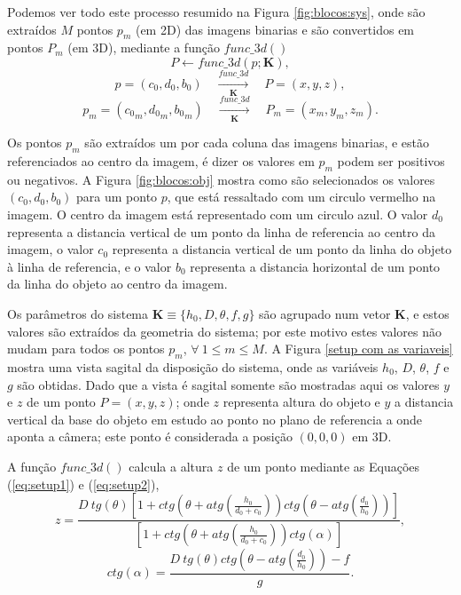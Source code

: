 \documentclass[a4paper, 12pt]{article}
\begin{document}
Podemos ver todo este processo resumido na Figura \ref{fig:blocos:sys},
onde são extraídos $M$ pontos $p_m$ (em 2D) das imagens binarias 
e são convertidos em pontos $P_m$ (em 3D),
mediante a função $func\_3d()$ 
\begin{equation}
P \leftarrow func\_3d(p;\mathbf{K}),
\end{equation}
\begin{equation}
p=(c_0,d_0,b_0)\quad \xrightarrow[\mathbf{K}]{func\_3d} \quad P=(x,y,z),
\end{equation}
\begin{equation}
p_m=({c_0}_m,{d_0}_m,{b_0}_m)\quad \xrightarrow[\mathbf{K}]{func\_3d}\quad P_m=(x_m,y_m,z_m).
\end{equation}

Os pontos $p_m$ são extraídos um por cada coluna das imagens binarias,
e estão referenciados ao centro da imagem, é dizer os valores em $p_m$ podem ser positivos ou negativos.
A Figura \ref{fig:blocos:obj} mostra como são selecionados os valores $(c_0,d_0,b_0)$ para um ponto $p$,
que está ressaltado com um circulo vermelho na imagem. 
O centro da imagem está representado com um circulo azul.
O valor $d_0$ representa a distancia vertical de um ponto da linha de referencia ao centro da imagem,
o valor $c_0$ representa a distancia vertical de um ponto da linha do objeto à linha de referencia, e
o valor $b_0$   representa a distancia horizontal de um ponto da linha do objeto ao centro da imagem.

Os parâmetros do sistema $\mathbf{K}\equiv \{h_0,D,\theta,f,g\}$ são agrupado num vetor $\mathbf{K}$,
e estos valores são extraídos da geometria do sistema; 
por este motivo estes valores não mudam para todos os pontos $p_m$, $\forall~ 1\leq m \leq M$.
A Figura \ref{setup com as variaveis} mostra uma vista sagital da disposição do sistema,
onde as variáveis $h_0$, $D$, $\theta$, $f$ e $g$ são obtidas. 
Dado que a vista é sagital somente são mostradas aqui os valores $y$ e $z$
de um ponto $P=(x,y,z)$;
onde $z$ representa  altura do objeto e 
$y$ a distancia vertical da base do objeto em estudo ao ponto no plano de referencia a onde aponta a câmera;
este ponto é considerada a posição $(0,0,0)$ em 3D.


A função $func\_3d()$ calcula a altura $z$ de um ponto mediante as
Equações (\ref{eq:setup1}) e (\ref{eq:setup2}),
\begin{equation}\label{eq:setup1}
z=\frac{
D~tg(\theta)
\left[
1+ ctg\left(\theta+atg\left(\frac{h_0}{d_0+c_0}\right)\right) ctg\left(\theta-atg\left(\frac{d_0}{h_0}\right)\right) 
\right]
}{
\left[1+ctg\left(\theta+atg\left(\frac{h_0}{d_0+c_0}\right)\right) ctg(\alpha)\right]
},
\end{equation}
\begin{equation}\label{eq:setup2}
ctg(\alpha)=\frac{D~tg(\theta)ctg\left(\theta-atg\left(\frac{d_0}{h_0}\right)\right)- f}{g}.
\end{equation}
\end{document}
